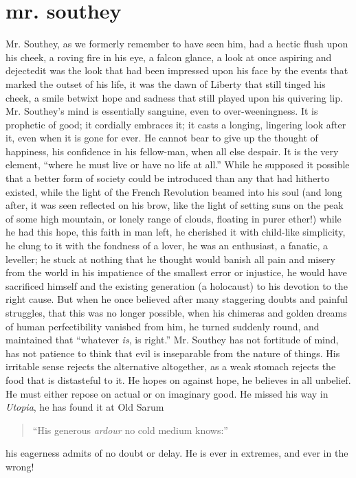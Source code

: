 \chapter[Mr. Southey]{mr. southey}

Mr. Southey, as we formerly remember to have seen him, had a
hectic flush upon his cheek, a roving fire in his eye, a falcon
glance, a look at once aspiring and dejected\textemdash it was the
look that had been impressed upon his face by the events that
marked the outset of his life, it was the dawn of Liberty that
still tinged his cheek, a smile betwixt hope and sadness that
still played upon his quivering lip. Mr. Southey's mind is
essentially sanguine, even to over-weeningness. It is prophetic of
good; it cordially embraces it; it casts a longing, lingering look
after it, even when it is gone for ever. He cannot bear to give up
the thought of happiness, his confidence in his fellow-man, when
all else despair.  It is the very element, ``where he must live or
have no life at all.''  While he supposed it possible that a
better form of society could be introduced than any that had
hitherto existed, while the light of the French Revolution beamed
into his soul (and long after, it was seen reflected on his brow,
like the light of setting suns on the peak of some high mountain,
or lonely range of clouds, floating in purer ether!)  while he had
this hope, this faith in man left, he cherished it with child-like
simplicity, he clung to it with the fondness of a lover, he was an
enthusiast, a fanatic, a leveller; he stuck at nothing that he
thought would banish all pain and misery from the world\textemdash
in his impatience of the smallest error or injustice, he would
have sacrificed himself and the existing generation (a holocaust)
to his devotion to the right cause. But when he once believed
after many staggering doubts and painful struggles, that this was
no longer possible, when his chimeras and golden dreams of human
perfectibility vanished from him, he turned suddenly round, and
maintained that ``whatever \emph{is}, is right.'' Mr.  Southey has
not fortitude of mind, has not patience to think that evil is
inseparable from the nature of things. His irritable sense rejects
the alternative altogether, as a weak stomach rejects the food
that is distasteful to it. He hopes on against hope, he believes
in all unbelief. He must either repose on actual or on imaginary
good. He missed his way in \emph{Utopia}, he has found it at Old
Sarum\textemdash
\begin{quote}
  ``His generous \emph{ardour} no cold medium knows:''
\end{quote}
his eagerness admits of no doubt or delay. He is ever in extremes,
and ever in the wrong!

